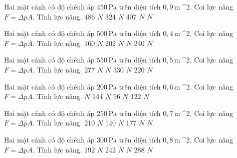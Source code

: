 \begin{ex}
Hai mặt cánh có độ chênh áp $450\,\text{Pa}$ trên diện tích $0,9\,\text{m}$ ^2. Coi lực nâng $F=\Delta pA$. Tính lực nâng.
\choice
{486 $N$}
{324 $N$}
{407 $N$}
{ $N$}
\end{ex}

\begin{ex}
Hai mặt cánh có độ chênh áp $500\,\text{Pa}$ trên diện tích $0,4\,\text{m}$ ^2. Coi lực nâng $F=\Delta pA$. Tính lực nâng.
\choice
{160 $N$}
{202 $N$}
{ $N$}
{240 $N$}
\end{ex}

\begin{ex}
Hai mặt cánh có độ chênh áp $550\,\text{Pa}$ trên diện tích $0,5\,\text{m}$ ^2. Coi lực nâng $F=\Delta pA$. Tính lực nâng.
\choice
{277 $N$}
{ $N$}
{330 $N$}
{220 $N$}
\end{ex}

\begin{ex}
Hai mặt cánh có độ chênh áp $200\,\text{Pa}$ trên diện tích $0,6\,\text{m}$ ^2. Coi lực nâng $F=\Delta pA$. Tính lực nâng.
\choice
{ $N$}
{144 $N$}
{96 $N$}
{122 $N$}
\end{ex}

\begin{ex}
Hai mặt cánh có độ chênh áp $250\,\text{Pa}$ trên diện tích $0,7\,\text{m}$ ^2. Coi lực nâng $F=\Delta pA$. Tính lực nâng.
\choice
{210 $N$}
{140 $N$}
{177 $N$}
{ $N$}
\end{ex}

\begin{ex}
Hai mặt cánh có độ chênh áp $300\,\text{Pa}$ trên diện tích $0,8\,\text{m}$ ^2. Coi lực nâng $F=\Delta pA$. Tính lực nâng.
\choice
{192 $N$}
{242 $N$}
{ $N$}
{288 $N$}
\end{ex}

